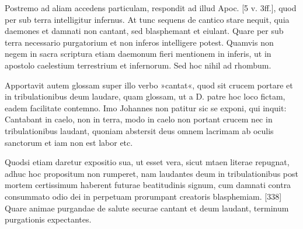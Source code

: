 Postremo ad aliam accedens particulam, respondit ad illud Apoc. [5 v. 3ff.], quod per sub terra intelligitur infernus. At tunc sequens de cantico stare nequit, quia daemones et damnati non cantant, sed blasphemant et eiulant. Quare per sub terra necessario purgatorium et non inferos intelligere potest. Quamvis non negem in sacra scriptura etiam daemonum fieri mentionem in inferis, ut in apostolo caelestium terrestrium et infernorum. Sed hoc nihil ad rhombum.

Apportavit autem glossam super illo verbo »cantat«, quod sit crucem portare et in tribulationibus deum laudare, quam glossam, ut a D. patre hoc loco fictam, eadem facilitate contemno. Imo Johannes non patitur sic se exponi, qui inquit: Cantabant in caelo, non in terra, modo in caelo non portant crucem nec in tribulationibus laudant, quoniam abstersit deus omnem lacrimam ab oculis sanctorum et iam non est labor etc.

Quodsi etiam daretur expositio sua, ut esset vera, sicut mtaen literae repugnat, adhuc hoc propositum non rumperet, nam laudantes deum in tribulationibus post mortem certissimum haberent futurae beatitudinis signum, cum damnati contra consummato odio dei in perpetuam prorumpant creatoris blasphemiam. [338] Quare animae purgandae de salute securae cantant et deum laudant, terminum purgationis expectantes.


